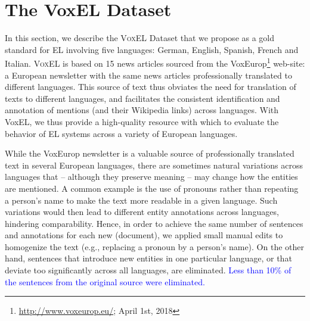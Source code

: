 \documentclass{llncs}
\begin{document}




\section{The VoxEL Dataset} \label{sec:voxel}

In this section, we describe the \textsc{VoxEL} Dataset that we propose as a gold standard for EL involving five languages: German, English, Spanish, French and Italian. \textsc{VoxEL} is based on 15 news articles sourced from the VoxEurop\footnote{\url{http://www.voxeurop.eu/}; April 1st, 2018} web-site: a European newsletter with the same news articles professionally translated to different languages. This source of text thus obviates the need for translation of texts to different languages, and facilitates the consistent identification and annotation of mentions (and their Wikipedia links) across languages. With VoxEL, we thus provide a high-quality resource with which to evaluate the behavior of EL systems across a variety of European languages. 

While the VoxEurop newsletter is a valuable source of professionally translated text in several European languages, there are sometimes natural variations across languages that -- although they preserve meaning -- may change how the entities are mentioned. A common example is the use of pronouns rather than repeating a person's name to make the text more readable in a given language. Such variations would then lead to different entity annotations across languages, hindering comparability. Hence, in order to achieve the same number of sentences and annotations for each new (document), we applied small manual edits to homogenize the text (e.g., replacing a pronoun by a person's name). On the other hand, sentences that introduce new entities in one particular language, or that deviate too significantly across all languages, are eliminated. \textcolor{blue}{Less than 10\% of the sentences from the original source were eliminated.}
\end{document}
